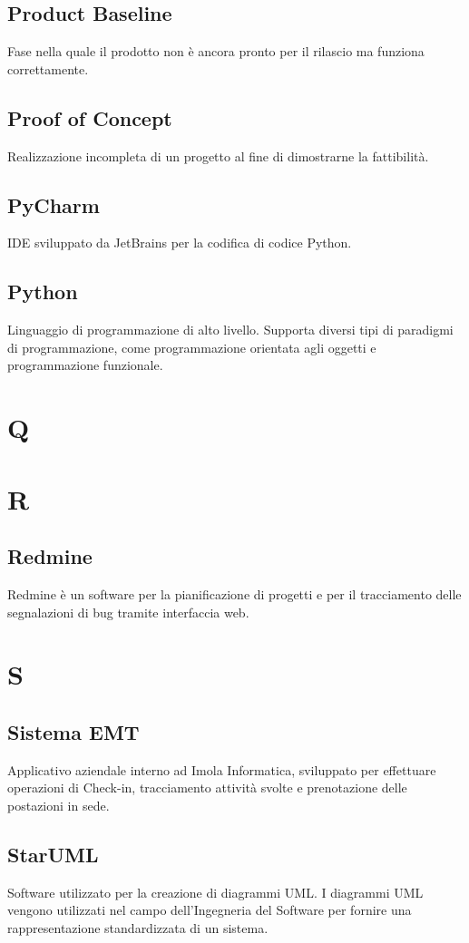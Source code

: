 \subsection{Product Baseline}
Fase nella quale il prodotto non è ancora pronto per il rilascio ma funziona correttamente.
\subsection{Proof of Concept}
Realizzazione incompleta di un progetto al fine di dimostrarne la fattibilità.
\subsection{PyCharm}
IDE sviluppato da JetBrains per la codifica di codice Python.
\subsection{Python}
Linguaggio di programmazione di alto livello. Supporta diversi tipi di paradigmi di programmazione, come programmazione
orientata agli oggetti e programmazione funzionale.
\newpage
\section{Q}
\section{R}
\subsection{Redmine}
Redmine è un software per la pianificazione di progetti e per il tracciamento delle segnalazioni di bug tramite interfaccia web.
\newpage
\section{S}
\subsection{Sistema EMT}
Applicativo aziendale interno ad Imola Informatica, sviluppato per effettuare operazioni di Check-in, tracciamento attività svolte e prenotazione delle postazioni in sede.
\subsection{StarUML}
Software utilizzato per la creazione di diagrammi UML. I diagrammi UML vengono utilizzati nel campo dell'Ingegneria del Software per fornire una rappresentazione standardizzata di un sistema.
